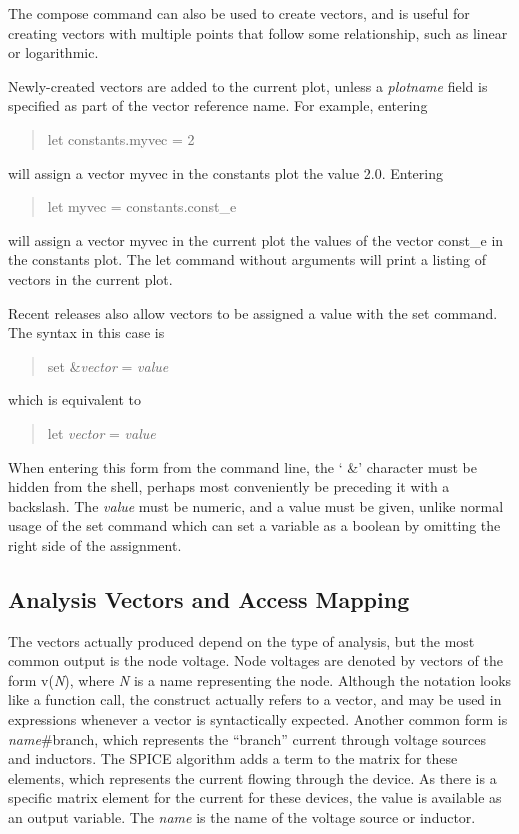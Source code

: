 The {\cb compose} command can also be used to create vectors, and is
useful for creating vectors with multiple points that follow some
relationship, such as linear or logarithmic.

Newly-created vectors are added to the current plot, unless a {\it
plotname} field is specified as part of the vector reference name. 
For example, entering
\begin{quote}
{\vt let constants.myvec = 2}
\end{quote}
will assign a vector {\vt myvec} in the {\vt constants} plot the value
2.0.  Entering
\begin{quote}
{\vt let myvec = constants.const\_e}
\end{quote}
will assign a vector {\vt myvec} in the current plot the values of the
vector {\vt const\_e} in the {\vt constants} plot.  The {\cb let} command
without arguments will print a listing of vectors in the current plot.

Recent {\WRspice} releases also allow vectors to be assigned a value
with the {\cb set} command.  The syntax in this case is
 
\begin{quote}
{\vt set \&}{\it vector} {\vt =} {\it value}
\end{quote}
 
which is equivalent to
 
\begin{quote}
{\vt let} {\it vector} {\vt =} {\it value}
\end{quote}
 
When entering this form from the {\WRspice} command line, the `{\vt
\&}' character must be hidden from the shell, perhaps most
conveniently be preceding it with a backslash.  The {\it value} must
be numeric, and a value must be given, unlike normal usage of the {\cb
set} command which can set a variable as a boolean by omitting the
right side of the assignment.

\subsection{Analysis Vectors and Access Mapping}

The vectors actually produced depend on the type of analysis, but the
most common output is the node voltage.  Node voltages are denoted by
vectors of the form {\vt v({\it N\/})}, where {\it N} is a name
representing the node.  Although the notation looks like a function
call, the construct actually refers to a vector, and may be used in
expressions whenever a vector is syntactically expected.  Another
common form is {\it name\/}{\vt \#branch}, which represents the
``branch'' current through voltage sources and inductors.  The SPICE
algorithm adds a term to the matrix for these elements, which
represents the current flowing through the device.  As there is a
specific matrix element for the current for these devices, the value
is available as an output variable.  The {\it name} is the name of the
voltage source or inductor.

